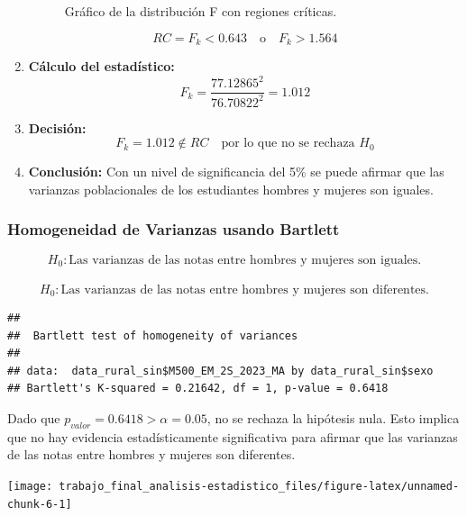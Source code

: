 \documentclass[
]{article}
\begin{document}
\begin{enumerate}
\begin{figure}[ht]
        \caption{Gráfico de la distribución F con regiones críticas.}
    \end{figure}  
   \[
    RC = F_k < 0.643 \quad \text{o} \quad F_k > 1.564
    \]

  \item \textbf{Cálculo del estadístico:}
    \[
    F_k = \frac{77.12865^{2}}{76.70822^{2}} = 1.012
    \]

  \item \textbf{Decisión:}
    \[
    F_k = 1.012 \notin RC \quad \text{por lo que no se rechaza } H_0
    \]

  \item \textbf{Conclusión:}
    Con un nivel de significancia del 5\% se puede afirmar que las varianzas poblacionales de los estudiantes hombres y mujeres son iguales.
\end{enumerate}

\subsubsection*{Homogeneidad de Varianzas usando
Bartlett}\label{homogeneidad-de-varianzas-usando-bartlett}

\[H_{0}: \text{Las varianzas de las notas entre hombres y mujeres son iguales.}\]\\
\[H_{0}: \text{Las varianzas de las notas entre hombres y mujeres son diferentes.}\]

\begin{verbatim}
## 
##  Bartlett test of homogeneity of variances
## 
## data:  data_rural_sin$M500_EM_2S_2023_MA by data_rural_sin$sexo
## Bartlett's K-squared = 0.21642, df = 1, p-value = 0.6418
\end{verbatim}

Dado que \(p_{valor}=0.6418>\alpha=0.05\), no se rechaza la hipótesis
nula. Esto implica que no hay evidencia estadísticamente significativa
para afirmar que las varianzas de las notas entre hombres y mujeres son
diferentes.

\begin{center}\texttt{[image: trabajo\_final\_analisis-estadistico\_files/figure-latex/unnamed-chunk-6-1]} \end{center}
\end{document}

